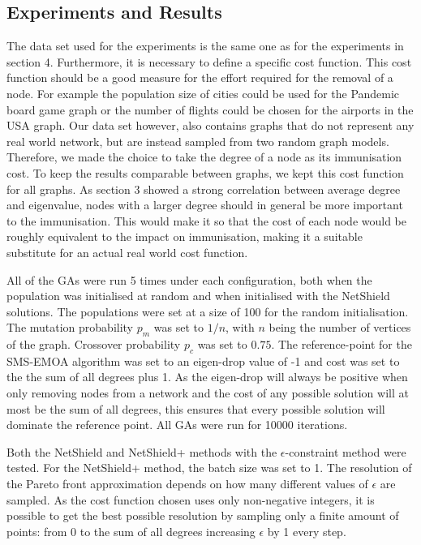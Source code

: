\documentclass[11pt]{article}
\theoremstyle{definition}
\begin{document}
\subsection{Experiments and Results}

The data set used for the experiments is the same one as for the experiments in section 4. Furthermore, it is necessary to define a specific cost function. This cost function should be a good measure for the effort required for the removal of a node. For example the population size of cities could be used for the Pandemic board game graph or the number of flights could be chosen for the airports in the USA graph. Our data set however, also contains graphs that do not represent any real world network, but are instead sampled from two random graph models. Therefore, we made the choice to take the degree of a node as its immunisation cost. To keep the results comparable between graphs, we kept this cost function for all graphs. As section 3 showed a strong correlation between average degree and eigenvalue, nodes with a larger degree should in general be more important to the immunisation. This would make it so that the cost of each node would be roughly equivalent to the impact on immunisation, making it a suitable substitute for an actual real world cost function.

All of the GAs were run 5 times under each configuration, both when the population was initialised at random and when initialised with the NetShield solutions. The populations were set at a size of 100 for the random initialisation. The mutation probability $p_m$ was set to $1/n$, with $n$ being the number of vertices of the graph. Crossover probability $p_c$ was set to $0.75$. The reference-point for the SMS-EMOA algorithm was set to an eigen-drop value of -1 and cost was set to the the sum of all degrees plus 1. As the eigen-drop will always be positive when only removing nodes from a network and the cost of any possible solution will at most be the sum of all degrees, this ensures that every possible solution will dominate the reference point. All GAs were run for 10000 iterations.

Both the NetShield and NetShield+ methods with the $\epsilon$-constraint method were tested. For the NetShield+ method, the batch size was set to 1. The resolution of the Pareto front approximation depends on how many different values of $\epsilon$ are sampled. As the cost function chosen uses only non-negative integers, it is possible to get the best possible resolution by sampling only a finite amount of points: from 0 to the sum of all degrees increasing $\epsilon$ by 1 every step.
\end{document}
